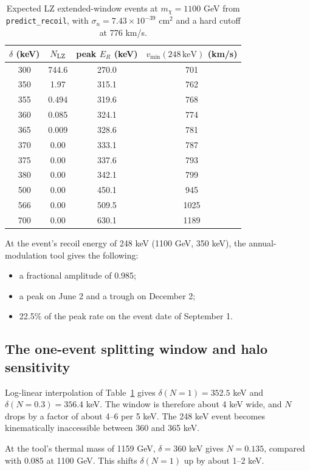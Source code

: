\documentclass[11pt,a4paper]{article}
\begin{document}
\begin{table}[h]
\centering
\begin{tabular}{cccc}
\toprule
$\delta$ (keV) & $N_{\rm LZ}$ & peak $E_R$ (keV) & $v_{\min}(248\,\mathrm{keV})$ (km/s)\\
\midrule
300 & 744.6 & 270.0 & 701\\
350 & 1.97 & 315.1 & 762\\
355 & 0.494 & 319.6 & 768\\
360 & 0.085 & 324.1 & 774\\
365 & 0.009 & 328.6 & 781\\
370 & 0.00 & 333.1 & 787\\
375 & 0.00 & 337.6 & 793\\
380 & 0.00 & 342.1 & 799\\
500 & 0.00 & 450.1 & 945\\
566 & 0.00 & 509.5 & 1025\\
700 & 0.00 & 630.1 & 1189\\
\bottomrule
\end{tabular}
\caption{Expected LZ extended-window events at $m_\chi=1100$ GeV from \texttt{predict\_recoil}, with $\sigma_n = 7.43\times10^{-39}$ cm$^2$ and a hard cutoff at 776 km/s.}
\label{tab:recoil}
\end{table}

At the event's recoil energy of 248 keV (1100 GeV, 350 keV), the annual-modulation tool gives the following:
\begin{itemize}
\item a fractional amplitude of 0.985;
\item a peak on June 2 and a trough on December 2;
\item 22.5\% of the peak rate on the event date of September 1.
\end{itemize}

\subsection{The one-event splitting window and halo sensitivity}
Log-linear interpolation of Table~\ref{tab:recoil} gives $\delta(N=1) = 352.5$ keV and $\delta(N=0.3) = 356.4$ keV. The window is therefore about 4 keV wide, and $N$ drops by a factor of about 4--6 per 5 keV. The 248 keV event becomes kinematically inaccessible between 360 and 365 keV.

At the tool's thermal mass of 1159 GeV, $\delta = 360$ keV gives $N = 0.135$, compared with 0.085 at 1100 GeV. This shifts $\delta(N=1)$ up by about 1--2 keV.
\end{document}
